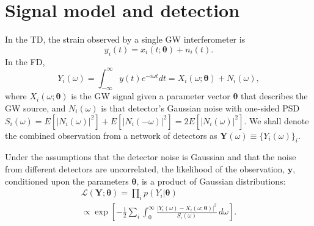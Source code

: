 \documentclass[amsmath,amssymb,aps,prx,reprint,nopreprintnumbers,nofootinbib,showpacs]{revtex4-1}
\begin{document}

\section{Signal model and detection}
\label{sec:detection}

In the \ac{TD}, the strain observed by a single \ac{GW} interferometer is
%
\begin{equation}
    y_i(t) = x_i (t; \bm\theta) + n_i (t).
\end{equation}
%
In the \ac{FD},
%
\begin{equation}\label{eq:signal-model}
    Y_i (\omega) = \int_{-\infty}^\infty y(t) e^{-i \omega t} dt = X_i (\omega; \bm\theta) + N_i (\omega),
\end{equation}
%
where $X_i (\omega; \bm\theta)$ is the \ac{GW} signal given a parameter vector $\bm\theta$ that describes the \ac{GW} source, and $N_i (\omega)$ is that detector's Gaussian noise with one\nobreakdashes-sided \ac{PSD} $S_i(\omega) = E\left[\left|N_i(\omega)\right|^2\right] + E\left[\left|N_i(-\omega)\right|^2\right] = 2 E\left[\left|N_i(\omega)\right|^2\right]$. We shall denote the combined observation from a network of detectors as $\mathbf Y (\omega) \equiv \{Y_i (\omega)\}_i$.

Under the assumptions that the detector noise is Gaussian and that the noise from different detectors are uncorrelated, the likelihood of the observation, $\mathbf y$, conditioned upon the parameters $\bm\theta$, is a product of Gaussian distributions:
%
\begin{multline}\label{eq:gaussian-likelihood}
    \mathcal{L}(\mathbf Y; \bm\theta) = \prod_i p(Y_i | \bm\theta)
        \\
        \propto \exp \left[
        - \frac{1}{2} \sum_i \int_0^\infty \frac{\left|Y_i (\omega)
            - X_i(\omega; \bm\theta) \right|^2}{S_i(\omega)} \, d\omega
    \right].
\end{multline}
\end{document}
